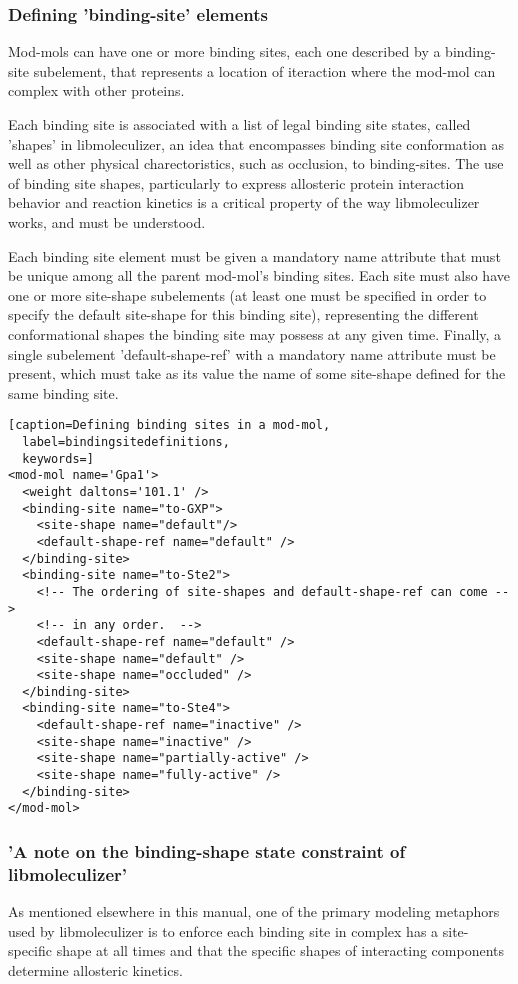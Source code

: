 \subsubsection{Defining 'binding-site' elements}
Mod-mols can have one or more binding sites, each one described by a
binding-site subelement, that represents a location of iteraction
where the mod-mol can complex with other proteins.  

Each binding site is associated with a list of legal binding
site states, called 'shapes' in libmoleculizer, an idea that
encompasses binding site conformation as well as other physical
charectoristics, such as occlusion, to binding-sites.  The use of
binding site shapes, particularly to express allosteric protein
interaction behavior and reaction kinetics is a critical property of
the way libmoleculizer works, and must be understood.  

Each binding site element must be given a mandatory name attribute
that must be unique among all the parent mod-mol's binding sites. Each
site must also have one or more site-shape subelements (at least one must be
specified in order to specify the default site-shape for this binding
site), representing the different conformational shapes the binding
site may possess at any given time.  Finally, a single subelement
'default-shape-ref' with a mandatory name attribute must be present,
which must take as its value the name of some site-shape defined for
the same binding site.

\lstset{language=XML}
\begin{lstlisting}[caption=Defining binding sites in a mod-mol,
  label=bindingsitedefinitions,
  keywords=]
<mod-mol name='Gpa1'>
  <weight daltons='101.1' />
  <binding-site name="to-GXP">
    <site-shape name="default"/>
    <default-shape-ref name="default" />
  </binding-site>
  <binding-site name="to-Ste2">
    <!-- The ordering of site-shapes and default-shape-ref can come -->
    <!-- in any order.  -->
    <default-shape-ref name="default" />
    <site-shape name="default" />
    <site-shape name="occluded" />
  </binding-site>
  <binding-site name="to-Ste4">
    <default-shape-ref name="inactive" />
    <site-shape name="inactive" />
    <site-shape name="partially-active" />
    <site-shape name="fully-active" />
  </binding-site>
</mod-mol>
\end{lstlisting}


\subsubsection{'A note on the binding-shape state constraint of
  libmoleculizer'}
As mentioned elsewhere in this manual, one of the primary modeling
metaphors used by libmoleculizer is to enforce each binding site in
complex has a site-specific shape at all times and that the specific
shapes of interacting components determine allosteric kinetics.  

